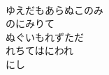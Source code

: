 \documentclass[10pt,b5j]{tarticle} %
\begin{document}
\begin{enumerate}
\begin{minipage}[c]{\blocksize}
        \vspace{\linespace}
        \item~\\
        ゆえだもあらぬこのみ\\
        のにみりて\\
        ぬぐいもれずただ\\
        れちてはにわれ\\
        にし
    
    \end{minipage}
\end{enumerate} %
\end{document}
